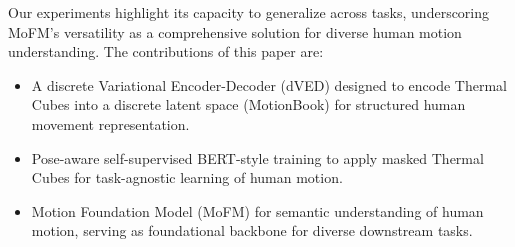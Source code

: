 Our experiments highlight its capacity to generalize across tasks, underscoring MoFM’s versatility as a comprehensive solution for diverse human motion understanding. The contributions of this paper are:

\begin{itemize}
    \item A discrete Variational Encoder-Decoder (dVED) designed to encode Thermal Cubes into a discrete latent space (MotionBook) for structured human movement representation.
    \item Pose-aware self-supervised BERT-style training to apply masked Thermal Cubes for task-agnostic learning of human motion.
    \item Motion Foundation Model (MoFM) for semantic understanding of human motion, serving as foundational backbone for diverse downstream tasks.
\end{itemize}
